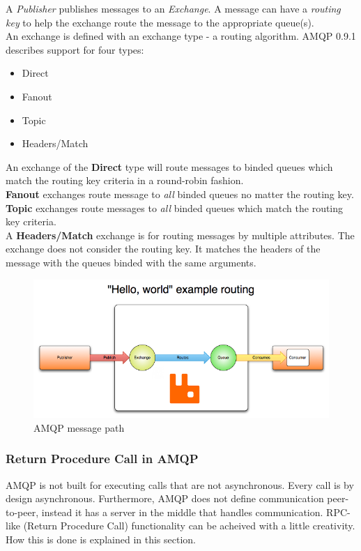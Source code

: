 A \textit{Publisher} publishes messages to an \textit{Exchange}. A message can have a \textit{routing key} to help the exchange route the message to the appropriate queue(s).\\
An exchange is defined with an exchange type - a routing algorithm. AMQP 0.9.1 describes support for four types\cite{Amqp091References}:
\begin{itemize}
\item Direct
\item Fanout
\item Topic
\item Headers/Match
\end{itemize}
An exchange of the \textbf{Direct} type will route messages to binded queues which match the routing key criteria in a round-robin fashion.\\
\textbf{Fanout} exchanges route message to \textit{all} binded queues no matter the routing key.\\
\textbf{Topic} exchanges route messages to \textit{all} binded queues which match the routing key criteria.\\
A \textbf{Headers/Match} exchange is for routing messages by multiple attributes. The exchange does not consider the routing key. It matches the headers of the message with the queues binded with the same arguments\cite{AmqpConcepts}.
\begin{figure}[H]
  \includegraphics[width=\textwidth]{illustrations/publisher-exchange-queue-consumer.png}
  \caption{AMQP message path\cite{AmqpConcepts}}
\end{figure}
\subsubsection{Return Procedure Call in AMQP}
AMQP is not built for executing calls that are not asynchronous. Every call is by design asynchronous. Furthermore, AMQP does not define communication peer-to-peer, instead it has a server in the middle that handles communication. RPC-like (Return Procedure Call) functionality can be acheived with a little creativity. How this is done is explained in this section.

